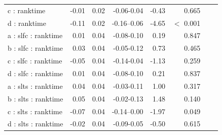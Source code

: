 \documentclass[pdflatex,sn-nature]{sn-jnl}%
\theoremstyle{thmstyleone}%
\theoremstyle{thmstyletwo}%
\theoremstyle{thmstylethree}%
\begin{document}
\begin{appendices}
\begin{table}[p]
\begin{tabular}{lrrrrrrr}
   c : ranktime & -0.01 & 0.02 & -0.06-0.04 & -0.43 &    0.665 \\ 
   d : ranktime & -0.11 & 0.02 & -0.16--0.06 & -4.65 &  $<$  0.001 \\ 
   a : slfc : ranktime & 0.01 & 0.04 & -0.08-0.10 & 0.19 &    0.847 \\ 
   b : slfc : ranktime & 0.03 & 0.04 & -0.05-0.12 & 0.73 &    0.465 \\ 
   c : slfc : ranktime & -0.05 & 0.04 & -0.14-0.04 & -1.13 &    0.259 \\ 
   d : slfc : ranktime & 0.01 & 0.04 & -0.08-0.10 & 0.21 &    0.837 \\ 
   a : slts : ranktime & 0.04 & 0.04 & -0.03-0.11 & 1.00 &    0.317 \\ 
   b : slts : ranktime & 0.05 & 0.04 & -0.02-0.13 & 1.48 &    0.140 \\ 
   c : slts : ranktime & -0.07 & 0.04 & -0.14--0.00 & -1.97 &    0.049 \\ 
   d : slts : ranktime & -0.02 & 0.04 & -0.09-0.05 & -0.50 &    0.615 \\ 
   \hline
\end{tabular}
\end{table}




\end{appendices}
\end{document}
